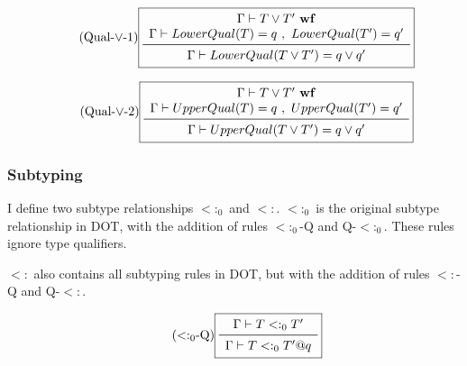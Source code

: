 \vspace{0.4cm}

\begin{equation*}\tag{\mbox{Qual-$\lor$-1}}\label{equ-qual-join-1}
\boxed{
\begin{array}{c}
\Gamma \vdash T \lor T'\ {\bf wf} \\
\Gamma \vdash LowerQual(T) = q\ ,\ LowerQual(T') = q' \\
\midrule
\Gamma \vdash LowerQual(T \lor T') = q \lor q' \\
\end{array}
}
\end{equation*}

\vspace{0.4cm}

\begin{equation*}\tag{\mbox{Qual-$\lor$}-2}\label{equ-qual-join-2}
\boxed{
\begin{array}{c}
\Gamma \vdash T \lor T'\ {\bf wf} \\
\Gamma \vdash UpperQual(T) = q\ ,\ UpperQual(T') = q' \\
\midrule
\Gamma \vdash UpperQual(T \lor T') = q \lor q' \\
\end{array}
}
\end{equation*}

\vspace{0.4cm}



\newpage

\subsubsection{Subtyping}

I define two subtype relationships \mbox{$<:_0$} and $<:$.
\mbox{$<:_0$} is the original subtype relationship in DOT,
with the addition of rules \mbox{$<:_0$-Q} and \mbox{Q-$<:_0$}.
These rules ignore type qualifiers.

\mbox{$<:$} also contains all subtyping rules in DOT,
but with the addition of rules \mbox{$<:$-Q} and \mbox{Q-$<:$}.


\begin{equation*}\tag{\mbox{$<:_0$-Q}}\label{equ-lt0-q}
\boxed{
\begin{array}{c}
\Gamma \vdash T <:_0 T' \\
\midrule
\Gamma \vdash T <:_0 T' @ q \\
\end{array}
}
\end{equation*}

